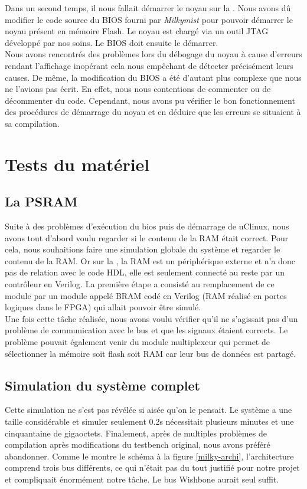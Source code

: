 Dans un second temps, il nous fallait démarrer le noyau sur la \nexys{}. Nous avons dû modifier le code source du BIOS fourni par \textit{Milkymist} pour pouvoir démarrer le noyau présent en mémoire Flash. Le noyau est chargé via un outil JTAG développé par nos soins. Le BIOS doit ensuite le démarrer.\\

Nous avons rencontrés des problèmes lors du débogage du noyau à cause d'erreurs rendant l'affichage inopérant cela nous empêchant de détecter précisément leurs causes. De même, la modification du BIOS a été d'autant plus complexe que nous ne l'avions pas écrit. En effet, nous nous contentions de commenter ou de décommenter du code. Cependant, nous avons pu vérifier le bon fonctionnement des procédures de démarrage du noyau et en déduire que les erreurs se situaient à sa compilation. 



\section{Tests du matériel}

\subsection{La PSRAM}

Suite à des problèmes d'exécution du bios puis de démarrage de uClinux, nous avons tout d'abord voulu regarder si le contenu de la RAM était correct. Pour cela, nous souhaitions faire une simulation globale du système et regarder le contenu de la RAM. Or sur la \nexys{}, la RAM est un périphérique externe et n'a donc pas de relation avec le code HDL, elle est seulement connecté au reste par un contrôleur en Verilog. La première étape a consisté au remplacement de ce module par un module appelé BRAM codé en Verilog (RAM réalisé en portes logiques dans le FPGA) qui allait pouvoir être simulé.\\
Une fois cette tâche réalisée, nous avons voulu vérifier qu'il ne s'agissait pas d'un problème de communication avec le bus et que les signaux étaient corrects. Le problème pouvait également venir du module multiplexeur qui permet de sélectionner la mémoire soit flash soit RAM car leur bus de données est partagé.

\subsection{Simulation du système complet}

Cette simulation ne s'est pas révélée si aisée qu'on le pensait. Le système a une taille considérable et simuler seulement 0.2s nécessitait plusieurs minutes et une cinquantaine de gigaoctets. Finalement, après de multiples problèmes de compilation après modifications du testbench original, nous avons préféré abandonner. Comme le montre le schéma à la figure \ref{milky-archi}, l'architecture comprend trois bus différents, ce qui n'était pas du tout justifié pour notre projet et compliquait énormément notre tâche. Le bus Wishbone aurait seul suffit.